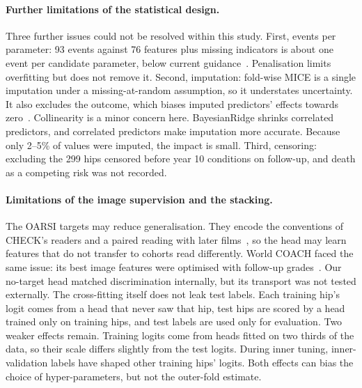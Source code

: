 \paragraph{Further limitations of the statistical design.}
Three further issues could not be resolved within this study. First, events per parameter: 93 events against 76
features plus missing indicators is about one event per candidate parameter, below current
guidance~\cite{riley2020samplesize}. Penalisation limits overfitting but does not remove it. Second, imputation: fold-wise MICE is a single imputation under a missing-at-random assumption, so it understates
uncertainty. It also excludes the outcome, which biases imputed predictors' effects towards zero~\cite{moons2006imputation,
vanbuuren2011mice}. Collinearity is a minor concern here. BayesianRidge shrinks correlated predictors, and correlated
predictors make imputation more accurate. Because only 2--5\% of values were imputed, the impact is small. Third,
censoring: excluding the 299 hips censored before year 10 conditions on follow-up, and death as a competing risk was
not recorded.

\paragraph{Limitations of the image supervision and the stacking.}
The OARSI targets may reduce generalisation. They encode the conventions of CHECK's readers and a paired reading with
later films~\cite{macri2022}, so the head may learn features that do not transfer to cohorts read differently. World
COACH faced the same issue: its best image features were optimised with follow-up grades~\cite{vandenberg2026}. Our
no-target head matched discrimination internally, but its transport was not tested externally. The cross-fitting
itself does not leak test labels. Each training hip's logit comes from a head that never saw that hip, test hips are
scored by a head trained only on training hips, and test labels are used only for evaluation. Two weaker effects
remain. Training logits come from heads fitted on two thirds of the data, so their scale differs slightly from the test
logits. During inner tuning, inner-validation labels have shaped other training hips' logits. Both effects can bias
the choice of hyper-parameters, but not the outer-fold estimate.

